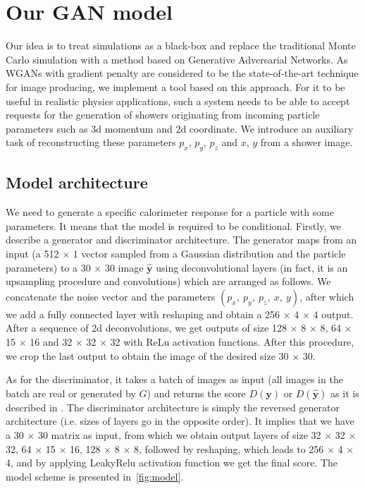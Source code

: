 \section{Our GAN model} \label{sec:model}
Our idea is to treat simulations as a black-box and replace the traditional Monte Carlo simulation with a method based on Generative Adversarial Networks. As WGANs with gradient penalty are considered to be the state-of-the-art technique for image producing, we implement a tool based on this approach. For it to be useful in realistic physics applications, such a system needs to be able to accept requests for the generation of showers originating from incoming particle parameters such as 3d momentum and 2d coordinate. We introduce an auxiliary task of reconstructing these parameters $p_x$, $p_y$, $p_z$ and $x$, $y$ from a shower image.

\subsection{Model architecture}

We need to generate a specific calorimeter response for a particle with some parameters. It means that the model is required to be conditional.
Firstly, we describe a generator and discriminator architecture. The generator maps from an input (a 512 $\times$ 1 vector sampled from a Gaussian distribution and the particle parameters) to a 30 $\times$ 30 image $\hat{\textbf{y}}$ using deconvolutional layers (in fact, it is an upsampling procedure and convolutions) which are arranged as follows. We concatenate the noise vector and the parameters $(p_x,~ p_y,~ p_z,~ x,~ y)$, after which we add a fully connected layer with reshaping and obtain a 256 $\times$ 4 $\times$ 4 output. After a sequence of 2d deconvolutions, we get outputs of size  128 $\times$ 8 $\times$ 8, 64 $\times$ 15 $\times$ 16 and 32 $\times$ 32 $\times$ 32  with ReLu activation functions. After this procedure, we crop the last output to obtain the image of the desired size 30 $\times$ 30.

As for the discriminator, it takes a batch of images as input (all images in the batch are real or generated by $G$) and returns the score $D(\textbf{y})$ or $D(\hat{\textbf{y}})$ as it is described in \cite{arjovsky2017wasserstein}. The discriminator architecture is simply the reversed generator architecture (i.e. sizes of layers go in the opposite order). It implies that we have a 30 $\times$ 30 matrix as input, from which we obtain output layers of size 32 $\times$ 32 $\times$ 32, 64 $\times$ 15 $\times$ 16, 128 $\times$ 8 $\times$  8, followed by reshaping, which  leads to 256 $\times$ 4 $\times$ 4, and by applying LeakyRelu activation function we get the final score. The model scheme is presented in~\cref{fig:model}.

